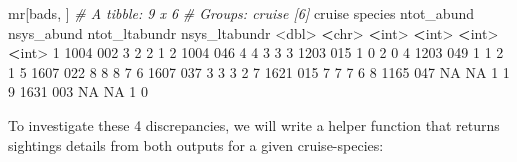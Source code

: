 \documentclass[
]{book}
\newenvironment{Shaded}{\begin{snugshade}}{\end{snugshade}}
\newcommand{\CommentTok}[1]{\textcolor[rgb]{0.56,0.35,0.01}{\textit{#1}}}
\newcommand{\ConstantTok}[1]{\textcolor[rgb]{0.00,0.00,0.00}{#1}}
\newcommand{\DecValTok}[1]{\textcolor[rgb]{0.00,0.00,0.81}{#1}}
\newcommand{\ErrorTok}[1]{\textcolor[rgb]{0.64,0.00,0.00}{\textbf{#1}}}
\newcommand{\NormalTok}[1]{#1}
\newcommand{\SpecialCharTok}[1]{\textcolor[rgb]{0.00,0.00,0.00}{#1}}
\begin{document}
\begin{Shaded}
\begin{Highlighting}[]
\NormalTok{mr[bads, ]}
\CommentTok{\# A tibble: 9 x 6}
\CommentTok{\# Groups:   cruise [6]}
\NormalTok{  cruise species ntot\_abund nsys\_abund ntot\_ltabundr nsys\_ltabundr}
   \SpecialCharTok{\textless{}}\NormalTok{dbl}\SpecialCharTok{\textgreater{}} \ErrorTok{\textless{}}\NormalTok{chr}\SpecialCharTok{\textgreater{}}        \ErrorTok{\textless{}}\NormalTok{int}\SpecialCharTok{\textgreater{}}      \ErrorTok{\textless{}}\NormalTok{int}\SpecialCharTok{\textgreater{}}         \ErrorTok{\textless{}}\NormalTok{int}\SpecialCharTok{\textgreater{}}         \ErrorTok{\textless{}}\NormalTok{int}\SpecialCharTok{\textgreater{}}
\DecValTok{1}   \DecValTok{1004} \DecValTok{002}              \DecValTok{3}          \DecValTok{2}             \DecValTok{2}             \DecValTok{1}
\DecValTok{2}   \DecValTok{1004} \DecValTok{046}              \DecValTok{4}          \DecValTok{4}             \DecValTok{3}             \DecValTok{3}
\DecValTok{3}   \DecValTok{1203} \DecValTok{015}              \DecValTok{1}          \DecValTok{0}             \DecValTok{2}             \DecValTok{0}
\DecValTok{4}   \DecValTok{1203} \DecValTok{049}              \DecValTok{1}          \DecValTok{1}             \DecValTok{2}             \DecValTok{1}
\DecValTok{5}   \DecValTok{1607} \DecValTok{022}              \DecValTok{8}          \DecValTok{8}             \DecValTok{8}             \DecValTok{7}
\DecValTok{6}   \DecValTok{1607} \DecValTok{037}              \DecValTok{3}          \DecValTok{3}             \DecValTok{3}             \DecValTok{2}
\DecValTok{7}   \DecValTok{1621} \DecValTok{015}              \DecValTok{7}          \DecValTok{7}             \DecValTok{7}             \DecValTok{6}
\DecValTok{8}   \DecValTok{1165} \DecValTok{047}             \ConstantTok{NA}         \ConstantTok{NA}             \DecValTok{1}             \DecValTok{1}
\DecValTok{9}   \DecValTok{1631} \DecValTok{003}             \ConstantTok{NA}         \ConstantTok{NA}             \DecValTok{1}             \DecValTok{0}
\end{Highlighting}
\end{Shaded}

To investigate these 4 discrepancies, we will write a helper function that returns sightings details from both outputs for a given cruise-species:
\end{document}
